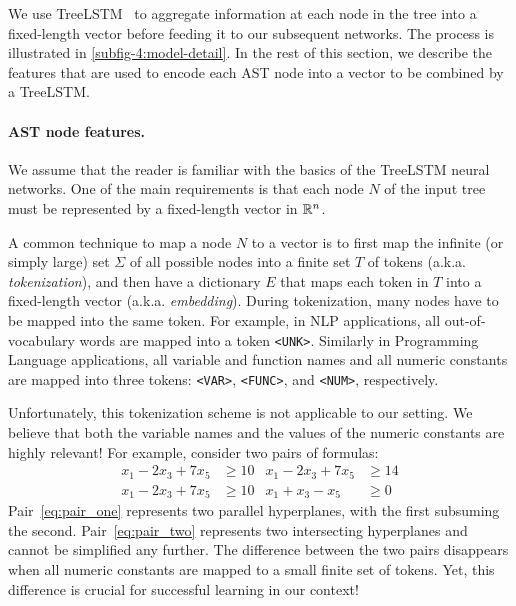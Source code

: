 We use TreeLSTM~\cite{TreeLSTM} to aggregate information at each node in the tree into a fixed-length vector before feeding it to our subsequent networks. The process is illustrated in \cref{subfig-4:model-detail}. In the rest of this section, we describe the features that are used to encode each AST node into a vector to be combined by a TreeLSTM.


\paragraph{AST node features.}
We assume that the reader is familiar with the basics of the TreeLSTM neural networks. One of the main requirements is that each node $N$ of the input tree must be represented by a fixed-length vector in $\mathbb{R}^n$.

A common technique to map a node $N$ to a vector is to first map the infinite (or simply large) set $\Sigma$ of all possible nodes into a finite set $T$ of tokens (a.k.a.  \emph{tokenization}), and then have a dictionary $E$ that maps each token in $T$ into a fixed-length vector (a.k.a. \emph{embedding}). During tokenization, many nodes have to be mapped into the same token. For example, in NLP applications, all out-of-vocabulary words are mapped into a token \texttt{<UNK>}. Similarly in Programming Language applications, all variable and function names and all numeric constants are mapped into three tokens: \texttt{<VAR>}, \texttt{<FUNC>}, and \texttt{<NUM>}, respectively.

Unfortunately, this tokenization scheme is not applicable to our setting. We believe that both the variable names and the values of the numeric constants are highly relevant! For example, consider two pairs of formulas:
\begin{align}
   x_1 - 2x_{3} + 7x_{5} &\geq 10 & x_1 - 2x_{3} + 7x_{5} &\geq 14 \label{eq:pair_one}\\
   x_1 - 2x_{3} + 7x_{5} &\geq 10 & x_1 + x_{3} - x_{5} &\geq 0 \label{eq:pair_two}
\end{align}
Pair~\eqref{eq:pair_one} represents two parallel hyperplanes, with the first subsuming the second. Pair~\eqref{eq:pair_two} represents two intersecting hyperplanes and cannot be simplified any further. The difference between the two pairs disappears when all numeric constants are mapped to a small finite set of tokens. Yet, this difference is crucial for successful learning in our context! 




